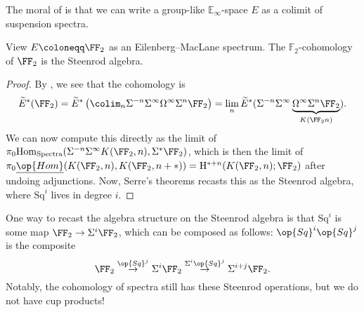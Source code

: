 \documentclass[../notes.tex]{subfiles}
\begin{document}
\begin{remark}
	The moral of  is that we can write a group-like $\mathbb E_\infty$-space $E$ as a colimit of suspension spectra.
\end{remark}
\begin{example}
	View $E\coloneqq\FF_2$ as an Eilenberg--MacLane spectrum. The $\mathbb F_2$-cohomology of $\FF_2$ is the Steenrod algebra.
\end{example}
\begin{proof}
	By , we see that the cohomology is
	\[\widetilde E^*(\FF_2)=\widetilde E^*\left(\colim_n\Sigma^{-n}\Sigma^\infty\Omega^\infty\Sigma^n\FF_2\right)=\lim_n\widetilde E^*(\Sigma^{-n}\Sigma^\infty\underbrace{\Omega^\infty\Sigma^n\FF_2}_{K(\FF_2n)}).\]
	We can now compute this directly as the limit of $\pi_0\mathrm{Hom}_{\mathrm{Spectra}}(\Sigma^{-n}\Sigma^\infty K(\FF_2,n),\Sigma^*\FF_2)$, which is then the limit of $\pi_0\underline{\op{Hom}}(K(\FF_2,n),K(\FF_2,n+*))=\mathrm H^{*+n}(K(\FF_2,n);\FF_2)$ after undoing adjunctions. Now, Serre's theorems recasts this as the Steenrod algebra, where $\mathrm{Sq}^i$ lives in degree $i$.
\end{proof}
\begin{remark}
	One way to recast the algebra structure on the Steenrod algebra is that $\mathrm{Sq}^i$ is some map $\FF_2\to\Sigma^i\FF_2$, which can be composed as follows: $\op{Sq}^i\op{Sq}^j$ is the composite
	\[\FF_2\stackrel{\op{Sq}^j}\to\Sigma^i\FF_2\stackrel{\Sigma^i\op{Sq}^j}\to\Sigma^{i+j}\FF_2.\]
	Notably, the cohomology of spectra still has these Steenrod operations, but we do not have cup products!
\end{remark}
\end{document}
